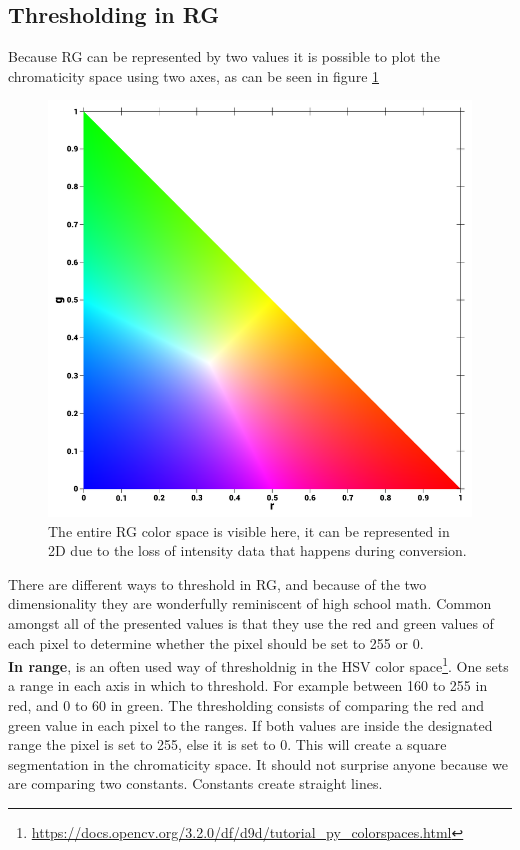 \subsection{Thresholding in RG}
Because RG can be represented by two values it is possible to plot the  chromaticity space using two axes, as can be seen in figure \ref{fig:rgbNorm}
\begin{figure}[H]
	\centering
	\includegraphics[width=0.5\linewidth]{figure/Analysis/normRGB.png}
	\caption{The entire RG color space is visible here, it can be represented in 2D due to the loss of intensity data that happens during conversion.}
	\label{fig:rgbNorm}
\end{figure}
There are different ways to threshold in RG, and because of the two dimensionality they are wonderfully reminiscent of high school math. Common amongst all of the presented values is that they use the red and green values of each pixel to determine whether the pixel should be set to 255
 or 0.\\
\textbf{In range}, is an often used way of thresholdnig in the HSV color space\footnote{\url{https://docs.opencv.org/3.2.0/df/d9d/tutorial\_py\_colorspaces.html}}. One sets a range in each axis in which to threshold. For example between 160 to 255 in red, and 0 to 60 in green. The thresholding consists of comparing the red and green value in each pixel to the ranges. If both values are inside the designated range the pixel is set to 255, else it is set to 0. This will create a square segmentation in the chromaticity space. It should not surprise anyone because we are comparing two constants. Constants create straight lines.\\

